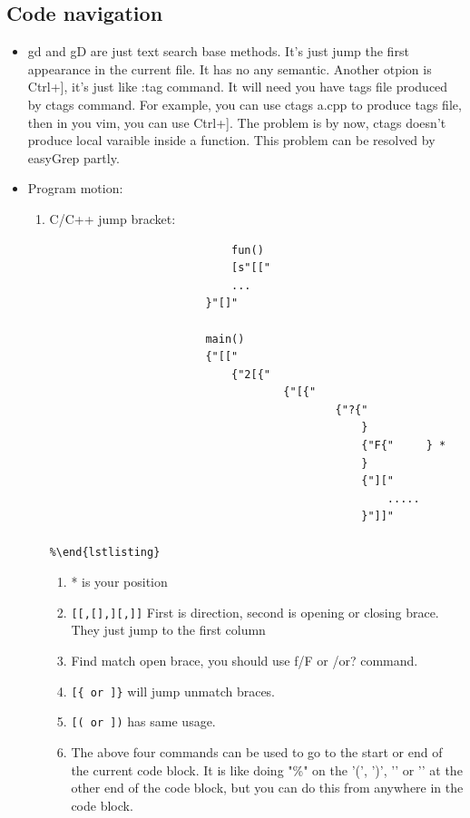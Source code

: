 \documentclass[paper=8.5in:11in, twoside, 12pt, pagesize=pdftex]{book}
\begin{document}
				\subsection{Code navigation}
				\begin{itemize}
					\item gd and gD are just text search base methods. It's just jump the first appearance in the current file. It has no any semantic. Another otpion is Ctrl+], it's just like :tag command. It will need you have tags file produced by ctags command. For example, you can use ctags a.cpp to produce tags file, then in you vim, you can use Ctrl+]. The problem is by now, ctags doesn't produce local varaible inside a function.  This problem can be resolved by easyGrep partly.
					
					\item  Program motion:
					\begin{enumerate}
						\item C/C++ jump bracket:
						\begin{verbatim}
							fun()
							[s"[["
							...
						}"[]"
						
						main()
						{"[["
							{"2[{"
									{"[{" 
											{"?{"
												}
												{"F{"     } *
												}
												{"]["
													.....
												}"]]"
												%\end{lstlisting}
											\end{verbatim}
											
											\begin{enumerate}
												\item * is your position
												\item \verb=[[,[],][,]]= First is direction, second is opening or closing brace. They just jump to the first column
												\item Find match open brace, you should use f/F or /or? command. 
												\item \verb=[{ or ]}= will jump unmatch braces. 
												\item \verb=[( or ])= has same usage.
												
												\item The above four commands can be used to go to the start or end of the current code block.  It is like doing "\%" on the '(', ')', '{' or '}' at the other end of the code block, but you can do this from anywhere in the code block.
											\end{enumerate}
											

\end{enumerate}
\end{itemize}
\end{document}
